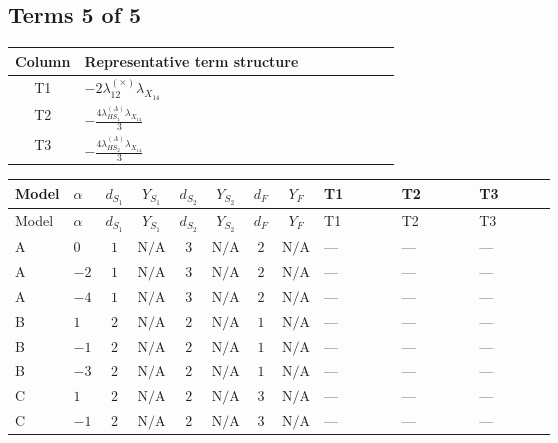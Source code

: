 \documentclass[8pt]{article}
\begin{document}
\begin{landscape}
\subsection*{Terms 5 of 5}
\begin{center}
\begin{tabular}{@{}c >{\raggedright\arraybackslash}p{0.82\linewidth}@{}}
\toprule
Column & Representative term structure \\
\midrule
T1 & \(\displaystyle -2 {\lambda_{12}^{(\times)}} {\lambda_{X_{14}}}\) \\
\midrule
T2 & \(\displaystyle -\frac{4 {\lambda_{HS_1}^{(A)}} {\lambda_{X_{14}}}}{3}\) \\
\midrule
T3 & \(\displaystyle -\frac{4 {\lambda_{HS_2}^{(A)}} {\lambda_{X_{14}}}}{3}\) \\
\midrule
\bottomrule
\end{tabular}
\end{center}
\smallskip
\tiny
\begin{longtable}{@{}llcccccc >{\raggedright\arraybackslash}p{0.21\linewidth} >{\raggedright\arraybackslash}p{0.21\linewidth} >{\raggedright\arraybackslash}p{0.21\linewidth}@{}}
\toprule
Model & $\alpha$ & $d_{S_1}$ & $Y_{S_1}$ & $d_{S_2}$ & $Y_{S_2}$ & $d_F$ & $Y_F$ & T1 & T2 & T3 \\
\midrule
\endfirsthead
\toprule
Model & $\alpha$ & $d_{S_1}$ & $Y_{S_1}$ & $d_{S_2}$ & $Y_{S_2}$ & $d_F$ & $Y_F$ & T1 & T2 & T3 \\
\midrule
\endhead
A & $0$ & $1$ & $\text{N/A}$ & $3$ & $\text{N/A}$ & $2$ & $\text{N/A}$ & --- & --- & --- \\
\midrule
A & $-2$ & $1$ & $\text{N/A}$ & $3$ & $\text{N/A}$ & $2$ & $\text{N/A}$ & --- & --- & --- \\
\midrule
A & $-4$ & $1$ & $\text{N/A}$ & $3$ & $\text{N/A}$ & $2$ & $\text{N/A}$ & --- & --- & --- \\
\midrule
B & $1$ & $2$ & $\text{N/A}$ & $2$ & $\text{N/A}$ & $1$ & $\text{N/A}$ & --- & --- & --- \\
\midrule
B & $-1$ & $2$ & $\text{N/A}$ & $2$ & $\text{N/A}$ & $1$ & $\text{N/A}$ & --- & --- & --- \\
\midrule
B & $-3$ & $2$ & $\text{N/A}$ & $2$ & $\text{N/A}$ & $1$ & $\text{N/A}$ & --- & --- & --- \\
\midrule
C & $1$ & $2$ & $\text{N/A}$ & $2$ & $\text{N/A}$ & $3$ & $\text{N/A}$ & --- & --- & --- \\
\midrule
C & $-1$ & $2$ & $\text{N/A}$ & $2$ & $\text{N/A}$ & $3$ & $\text{N/A}$ & --- & --- & --- \\

\end{longtable}
\end{landscape}
\end{document}
